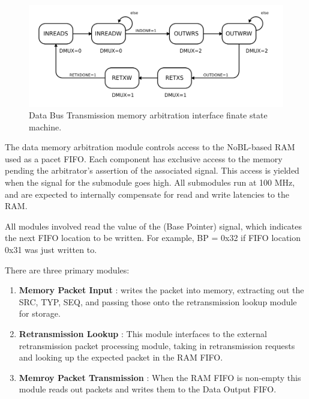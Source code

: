 \begin{figure}
\begin{centering}
\includegraphics[scale=0.8]{data.memarbit.fsm.svg}
\end{centering}
\caption{Data Bus Transmission memory arbitration interface finate state machine.}
\label{data.memarbit.fsm}
\end{figure}

The data memory arbitration module controls access to the NoBL-based
RAM used as a pacet FIFO. Each component has exclusive access to the
memory pending the arbitrator's assertion of the associated
 signal. This access is yielded when the 
signal for the submodule goes high. All submodules run at 100 MHz, and
are expected to internally compensate for read and write latencies to
the RAM.

All modules involved read the value of the  (Base
Pointer) signal, which indicates the next FIFO location to be written.
For example, BP = 0x32 if FIFO location 0x31 was just written to.

There are three primary modules: 
\begin{enumerate}
\item \textbf{Memory Packet Input} : writes the packet into memory,
  extracting out the SRC, TYP, SEQ, and passing those onto the
  retransmission lookup module for storage.
\item \textbf{Retransmission Lookup} : This module interfaces to the
  external retransmission packet processing module, taking in
  retransmission requests and looking up the expected packet in the
  RAM FIFO.
\item \textbf{Memroy Packet Transmission} : When the RAM FIFO is
  non-empty this module reads out packets and writes them to the Data
  Output FIFO.
\end{enumerate}

